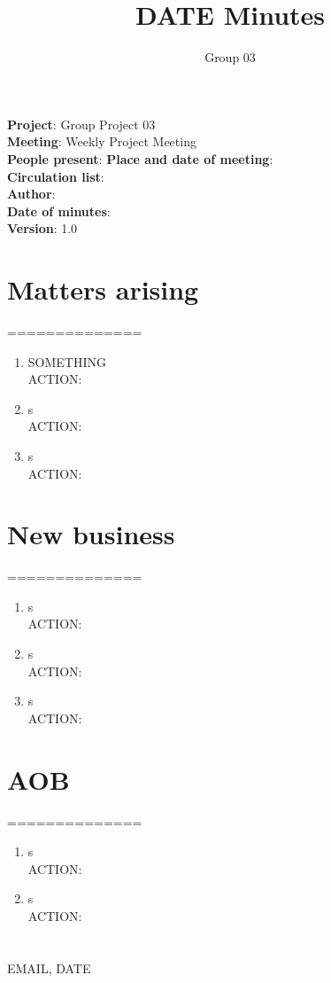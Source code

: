 \documentclass[10pt]{article}
\begin{document}
\title{DATE Minutes}
\author{Group 03}     
\maketitle
\noindent
\textbf{Project}: Group Project 03 \\
\textbf{Meeting}: Weekly Project Meeting \\
\textbf{People present}: 
\textbf{Place and date of meeting}:  \\
\textbf{Circulation list}:  \\
\textbf{Author}: \\
\textbf{Date of minutes}: \\
\textbf{Version}: 1.0

\section{Matters arising}
============== \\
\begin{enumerate}
\item SOMETHING \\ 
ACTION: 
\item s \\ 
ACTION: 
\item s \\ 
ACTION: 
\end{enumerate}

\section{New business}
============== \\
\begin{enumerate}
\item s \\
ACTION: 
\item s \\
ACTION: 
\item s \\
ACTION: 
\end{enumerate}

\section{AOB}
============== \\
\begin{enumerate}
\item s \\ 
ACTION:
\item s \\ 
ACTION:
\end{enumerate}

\section*{}
 EMAIL, DATE
\end{document}
